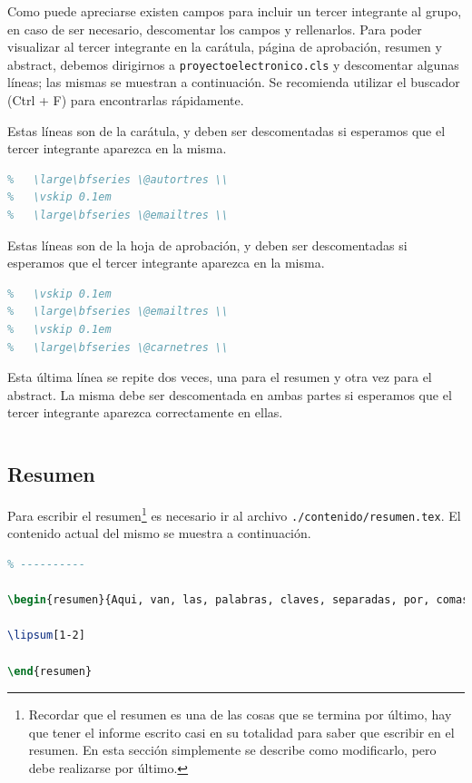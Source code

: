 Como puede apreciarse existen campos para incluir un tercer integrante al grupo, en caso de ser necesario, descomentar los campos y rellenarlos. Para poder visualizar al tercer integrante en la carátula, página de aprobación, resumen y abstract, debemos dirigirnos a \texttt{proyectoelectronico.cls} y descomentar algunas líneas; las mismas se muestran a continuación. Se recomienda utilizar el buscador (Ctrl + F) para encontrarlas rápidamente.

Estas líneas son de la carátula, y deben ser descomentadas si esperamos que el tercer integrante aparezca en la misma.

\footnotesize
\begin{lstlisting}[language=TeX, numbers=none]
%	\vskip 0.8em
%	\large\bfseries \@autortres \\
%	\vskip 0.1em
%	\large\bfseries \@emailtres \\
\end{lstlisting}
\normalsize

\clearpage
Estas líneas son de la hoja de aprobación, y deben ser descomentadas si esperamos que el tercer integrante aparezca en la misma.

\footnotesize
\begin{lstlisting}[language=TeX, numbers=none]
%	\large\bfseries \@autortres \\
%	\vskip 0.1em
%	\large\bfseries \@emailtres \\
%	\vskip 0.1em
%	\large\bfseries \@carnetres \\
\end{lstlisting}
\normalsize

Esta última línea se repite dos veces, una para el resumen y otra vez para el abstract. La misma debe ser descomentada en ambas partes si esperamos que el tercer integrante aparezca correctamente en ellas.

\footnotesize
\begin{lstlisting}[language=TeX, numbers=none]
%		\large\bfseries\@autortres
\end{lstlisting}
\normalsize

\subsection{Resumen}

Para escribir el resumen\footnote{Recordar que el resumen es una de las cosas que se termina por último, hay que tener el informe escrito casi en su totalidad para saber que escribir en el resumen. En esta sección simplemente se describe como modificarlo, pero debe realizarse por último.} es necesario ir al archivo \texttt{./contenido/resumen.tex}. El contenido actual del mismo se muestra a continuación.
\footnotesize
\begin{lstlisting}[language=TeX]
% EL RESUMEN
% ----------

\begin{resumen}{Aqui, van, las, palabras, claves, separadas, por, comas}

\lipsum[1-2]

\end{resumen}
\end{lstlisting}
\normalsize

